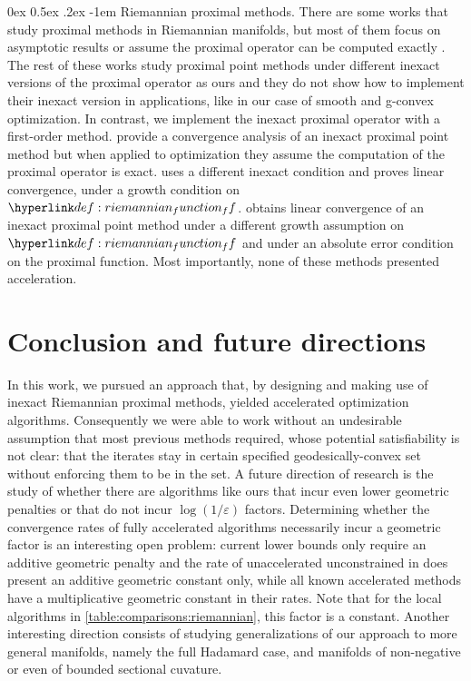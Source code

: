 \documentclass[12pt]{alt2021}
\makeatletter
\let\epsilon\varepsilon
\renewcommand\paragraph{\@startsection{paragraph}{4}{\z@}%
                                    {0ex \@plus0.5ex \@minus.2ex}%
                                    {-1em}%
                                    {\normalfont\normalsize\bfseries}}
\makeatother
\begin{document}
\paragraph{Riemannian proximal methods.} There are some works that study proximal methods in Riemannian manifolds, but most of them focus on asymptotic results or assume the proximal operator can be computed exactly \citep{wang2015convergence, bento2017iteration, bento2016new, khammahawong2021tseng, chang2021inertial}. The rest of these works study proximal point methods under different inexact versions of the proximal operator as ours and they do not show how to implement their inexact version in applications, like in our case of smooth and g-convex optimization. In contrast, we implement the inexact proximal operator with a first-order method. \citep{ahmadi2014convergence} provide a convergence analysis of an inexact proximal point method but when applied to optimization they assume the computation of the proximal operator is exact. \citep{tang2014rate} uses a different inexact condition and proves linear convergence, under a growth condition on $\f$. \citep{wang2016proximal} obtains linear convergence of an inexact proximal point method under a different growth assumption on $\f$ and under an absolute error condition on the proximal function. Most importantly, none of these methods presented acceleration.










\section{Conclusion and future directions}\label{sec:future_work}
In this work, we pursued an approach that, by designing and making use of inexact Riemannian proximal methods, yielded accelerated optimization algorithms. Consequently we were able to work without an undesirable assumption that most previous methods required, whose potential satisfiability is not clear: that the iterates stay in certain specified geodesically-convex set without enforcing them to be in the set. A future direction of research is the study of whether there are algorithms like ours that incur even lower geometric penalties or that do not incur $\log(1/\epsilon)$ factors. Determining whether the convergence rates of fully accelerated algorithms necessarily incur a geometric factor is an interesting open problem: current lower bounds only require an additive geometric penalty and the rate of unaccelerated unconstrained \RGD{} in \citep[Thm. 15]{zhang2016first} does present an additive geometric constant only, while all known accelerated methods have a multiplicative geometric constant in their rates. Note that for the local algorithms in \cref{table:comparisons:riemannian}, this factor is a constant. Another interesting direction consists of studying generalizations of our approach to more general manifolds, namely the full Hadamard case, and manifolds of non-negative or even of bounded sectional cuvature.
\end{document}

